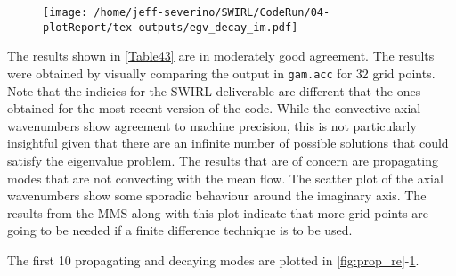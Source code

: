 \begin{figure}[h!]
    \centering
    \texttt{[image: /home/jeff-severino/SWIRL/CodeRun/04-plotReport/tex-outputs/egv\_decay\_im.pdf]}
    \label{fig:decay_im} 
\end{figure}








The results shown in \ref{Table43} are in moderately good agreement. The 
results were obtained by visually comparing the output in \verb|gam.acc| for 32 
grid points. Note that the indicies for the SWIRL deliverable are different that 
the ones obtained for the most recent version of the code. While the 
convective axial wavenumbers show agreement to machine precision, this is not 
particularly insightful given that there are an infinite number of possible solutions 
that could satisfy the eigenvalue problem. The results that are of concern 
are propagating modes that are not convecting with the mean flow.  The scatter plot
of the axial wavenumbers show some sporadic behaviour around the imaginary axis.
The results from the MMS along with this plot indicate that more grid points are going 
to be needed if a finite difference technique is to be used.

The first 10 propagating and decaying modes are plotted in \ref{fig:prop_re}-\ref{fig:decay_im}.





